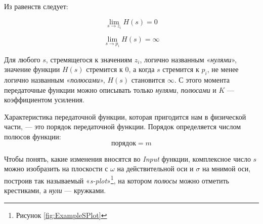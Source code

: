 \documentclass[a4paper, 10pt, final]{article} %
\begin{document}
    \noindent Из равенств следует:
    \begin{figure}[H]
        \centering
        \begin{minipage}[b]{.3\linewidth}
            \centering
            \[
                \lim_{s \to z_i} H(s) = 0
            \]
        \end{minipage}
        \hspace{0.04\linewidth}
        \begin{minipage}[b]{.3\linewidth}
            \centering
            \[
                \lim_{s \to p_i} H(s) = \infty
            \]
        \end{minipage}
    \end{figure}
    \noindent Для любого $s$, стремящегося к значениям $z_i$, логично названным «\emph{нулями}», значение функции $H(s)$ стремится к $0$, а когда $s$ стремится к $p_i$, не менее логично названным «\emph{полюсами}», $H(s)$ становится $\infty$.
    С этого момента передаточные функции можно описывать только \emph{нулями}, \emph{полюсами} и $K$ --- коэффициентом усиления.

    Характеристика передаточной функции, которая пригодится нам  в физической части, --- это порядок передаточной функции.
    Порядок определяется числом полюсов функции:
    \[
        \text{порядок} = m
    \]

    Чтобы понять, какие изменения вносятся во \emph{Input} функции, комплексное число $s$ можно изобразить на плоскости с $\omega$ на действительной оси и $\sigma$ на мнимой оси, построив так называемый «\emph{s-plot}»\footnote{Рисунок \ref{fig:ExampleSPlot}}, на котором \emph{полюсы} можно отметить крестиками, а \emph{нули} --- кружками.
\end{document}
